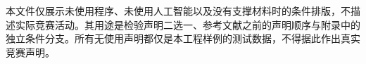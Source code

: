 本文件仅展示未使用程序、未使用人工智能以及没有支撑材料时的条件排版，不描述实际竞赛活动。其用途是检验声明二选一、参考文献之前的声明顺序与附录中的独立条件分支。所有无使用声明都仅是本工程样例的测试数据，不得据此作出真实竞赛声明。